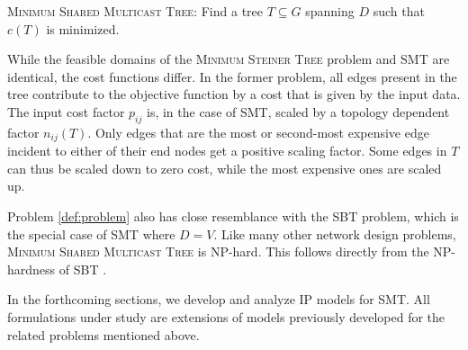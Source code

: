 \begin{problem}
\label{def:problem}
\textsc{Minimum Shared Multicast Tree}: Find a tree $T\subseteq G$ spanning $D$ such that $c(T)$ is minimized.
\end{problem}

While the feasible domains of the \textsc{Minimum Steiner Tree} problem and SMT are identical,
the cost functions differ.
In the former problem, all edges present in the tree contribute to the objective function by a cost that is given by the input data.
The input cost factor $p_{ij}$ is, in the case of SMT, scaled by a topology dependent factor $n_{ij}(T)$.
Only edges that are the most or second-most expensive edge incident to either of their end nodes get a positive scaling factor.
Some edges in $T$ can thus be scaled down to zero cost, while the most expensive ones are scaled up.

Problem \ref{def:problem} also has close resemblance with the SBT problem, which is the special case of SMT where $D=V$.
Like many other network design problems, \textsc{Minimum Shared Multicast Tree} is NP-hard.
This follows directly from the NP-hardness of SBT \citep{Papadimitriou06SBT}.


In the forthcoming sections, we develop and analyze IP models for SMT.
All formulations under study are extensions of models previously developed for the related problems mentioned above.
